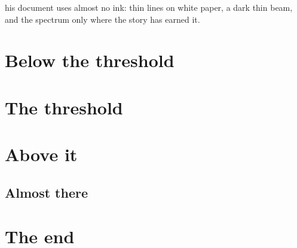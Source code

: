 \documentclass[10pt,a4paper]{article}
\begin{document}
his document uses almost no ink: thin lines on white paper, a dark thin beam, and the spectrum
only where the story has earned it. \lipsum[1]
\section{Below the threshold}
\lipsum[2-5]
\section{The threshold}
\limenthreshold
\lipsum[6-9]
\limenrule
\section{Above it}
\lipsum[10-16]
\subsection{Almost there}
\lipsum[17-22]
\section{The end}
\lipsum[23]
\end{document}
